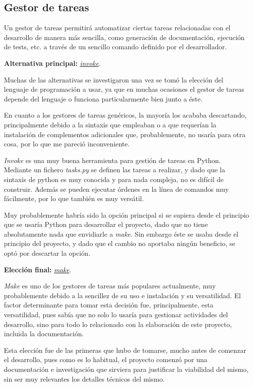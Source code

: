 \subsection{Gestor de tareas}

Un gestor de tareas permitirá automatizar ciertas tareas relacionadas con el desarrollo de manera más sencilla, como generación de documentación, ejecución de tests, etc. a través de un sencillo comando definido por el desarrollador.


\textbf{Alternativa principal:} \href{https://www.pyinvoke.org/}{\textit{invoke}}.

Muchas de las alternativas se investigaron una vez se tomó la elección del lenguaje de programación a usar, ya que en muchas ocasiones el gestor de tareas depende del lenguaje o funciona particularmente bien junto a éste. 

En cuanto a los gestores de tareas genéricos, la mayoría los acababa descartando, principalmente debido a la sintaxis que empleaban o a que requerían la instalación de complementos adicionales que, probablemente, no usaría para otra cosa, por lo que me pareció inconveniente.

\textit{Invoke} es una muy buena herramienta para gestión de tareas en Python. Mediante un fichero \textit{tasks.py} se definen las tareas a realizar, y dado que la sintaxis de python es muy conocida y para nada compleja, no es difícil de construir. Además se pueden ejecutar órdenes en la línea de comandos muy fácilmente, por lo que también es muy versátil.

Muy probablemente habría sido la opción principal si se supiera desde el principio que se usaría Python para desarrollar el proyecto, dado que no tiene absolutamente nada que envidiarle a \textit{make}. Sin embargo éste se usaba desde el principio del proyecto, y dado que el cambio no aportaba ningún beneficio, se optó por descartar la opción.

\textbf{Elección final:} \href{https://www.gnu.org/software/make/}{\textit{make}}.

\textit{Make} es uno de los gestores de tareas más populares actualmente, muy probablemente debido a la sencillez de su uso e instalación y su versatilidad. El factor determinante para tomar esta decisión fue, principalmente, esta versatilidad, pues sabía que no solo lo usaría para gestionar actividades del desarrollo, sino para todo lo relacionado con la elaboración de este proyecto, incluida la documentación.

Esta elección fue de las primeras que hubo de tomarse, mucho antes de comenzar el desarrollo, pues como es lo habitual, el proyecto comenzó por una documentación e investigación que sirviera para justificar la viabilidad del mismo, sin ser muy relevantes los detalles técnicos del mismo.

